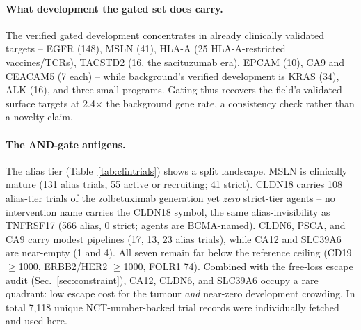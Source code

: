 \paragraph{What development the gated set does carry.} The verified gated
development concentrates in already clinically validated targets -- EGFR (148),
MSLN (41), HLA-A (25 HLA-A-restricted vaccines/TCRs), TACSTD2 (16, the
sacituzumab era), EPCAM (10), CA9 and CEACAM5 (7 each) -- while background's
verified development is KRAS (34), ALK (16), and three small programs. Gating
thus recovers the field's validated surface targets at 2.4$\times$ the
background gene rate, a consistency check rather than a novelty claim.

\paragraph{The AND-gate antigens.} The alias tier (Table~\ref{tab:clintrials})
shows a split landscape. MSLN is clinically mature (131 alias trials,
55 active or recruiting; 41 strict). CLDN18 carries
108 alias-tier trials of the zolbetuximab generation yet \emph{zero}
strict-tier agents -- no intervention name carries the CLDN18 symbol, the same
alias-invisibility as TNFRSF17 (566 alias, 0 strict; agents are
BCMA-named). CLDN6, PSCA, and CA9 carry modest pipelines (17,
13, 23 alias trials), while CA12 and SLC39A6 are near-empty
(1 and 4). All seven remain far below the reference ceiling
(CD19 $\geq$1000, ERBB2/HER2 $\geq$1000, FOLR1 74).
Combined with the free-loss escape audit (Sec.~\ref{sec:constraint}), CA12,
CLDN6, and SLC39A6 occupy a rare quadrant: low escape cost for the tumour
\emph{and} near-zero development crowding. In total 7,118 unique
NCT-number-backed trial records were individually fetched and used here.

